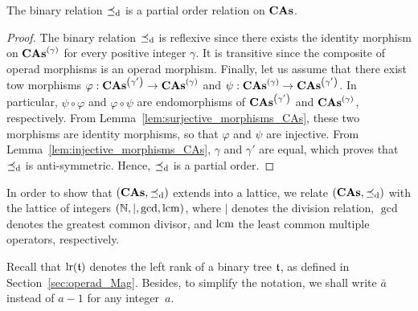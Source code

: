 \begin{Proposition}\label{prop:poset_CAs}
    The binary relation $\preceq_{\mathrm{d}}$ is a partial order relation on
    $\mathbf{CAs}$.
\end{Proposition}
\begin{proof}
    The binary relation $\preceq_{\mathrm{d}}$ is reflexive since there exists the
    identity morphism on $\mathbf{CAs}^{\left(\gamma\right)}$ for every positive integer
    $\gamma$. It is transitive since the composite of operad morphisms is
    an operad morphism. Finally, let us assume that there exist  tow
    morphisms $\varphi:\mathbf{CAs}^{\left(\gamma'\right)}\to\mathbf{CAs}^{\left(\gamma\right)}$ and
    $\psi:\mathbf{CAs}^{\left(\gamma\right)}\to\mathbf{CAs}^{\left(\gamma'\right)}$. In particular,
    $\psi \circ \varphi$ and $\varphi \circ \psi$ are endomorphisms of
    $\mathbf{CAs}^{\left(\gamma'\right)}$ and $\mathbf{CAs}^{\left(\gamma\right)}$, respectively. From
    Lemma~\ref{lem:surjective_morphisms_CAs}, these two morphisms are
    identity morphisms, so that $\varphi$ and $\psi$ are injective. From
    Lemma~\ref{lem:injective_morphisms_CAs}, $\gamma$ and $\gamma'$ are
    equal, which proves that $\preceq_{\mathrm{d}}$ is anti-symmetric. Hence,
    $\preceq_{\mathrm{d}}$ is a partial order.
\end{proof}
\medbreak

In order to show that $\left(\mathbf{CAs}, \preceq_{\mathrm{d}}\right)$ extends into a
lattice, we relate $\left(\mathbf{CAs}, \preceq_{\mathrm{d}}\right)$ with the lattice of
integers $\left(\mathbb{N},\mid, \gcd, \operatorname{lcm}\right)$, where $\mid$ denotes the
division relation, $\gcd$ denotes the greatest common divisor, and
$\operatorname{lcm}$ the least common multiple operators, respectively.
\medbreak

Recall that $\mathrm{lr}(\mathfrak{t})$ denotes the left rank of a binary tree
$\mathfrak{t}$, as defined in Section~\ref{sec:operad_Mag}. Besides, to simplify
the notation, we shall write $\bar{a}$ instead of $a - 1$ for any
integer~$a$.
\medbreak

